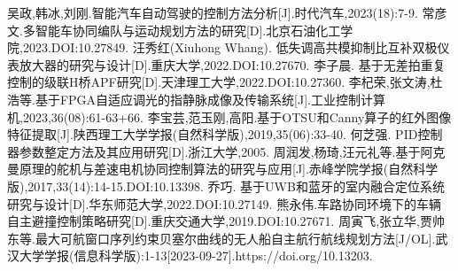 \documentclass{article}%
\begin{document}
\begin{multicols}{2}
\begin{thebibliography}{15}
			吴政,韩冰,刘刚.智能汽车自动驾驶的控制方法分析[J].时代汽车,2023(18):7-9.			
			常彦文.多智能车协同编队与运动规划方法的研究[D].北京石油化工学院,2023.DOI:10.27849.
			汪秀红(Xiuhong Whang). 低失调高共模抑制比互补双极仪表放大器的研究与设计[D].重庆大学,2022.DOI:10.27670.
			李子晨. 基于无差拍重复控制的级联H桥APF研究[D].天津理工大学,2022.DOI:10.27360.
			李杞荣,张文涛,杜浩等.基于FPGA自适应调光的指静脉成像及传输系统[J].工业控制计算机,2023,36(08):61-63+66.
			李宝芸,范玉刚,高阳.基于OTSU和Canny算子的红外图像特征提取[J].陕西理工大学学报(自然科学版),2019,35(06):33-40.
			何芝强. PID控制器参数整定方法及其应用研究[D].浙江大学,2005.
			周润发,杨琦,汪元礼等.基于阿克曼原理的舵机与差速电机协同控制算法的研究与应用[J].赤峰学院学报(自然科学版),2017,33(14):14-15.DOI:10.13398.
			乔巧. 基于UWB和蓝牙的室内融合定位系统研究与设计[D].华东师范大学,2022.DOI:10.27149.
			熊永伟.车路协同环境下的车辆自主避撞控制策略研究[D].重庆交通大学,2019.DOI:10.27671.
			周寅飞,张立华,贾帅东等.最大可航窗口序列约束贝塞尔曲线的无人船自主航行航线规划方法[J/OL].武汉大学学报(信息科学版):1-13[2023-09-27].https://doi.org/10.13203.
		\end{thebibliography}
		
	\end{multicols}%
	
		
\end{document}
